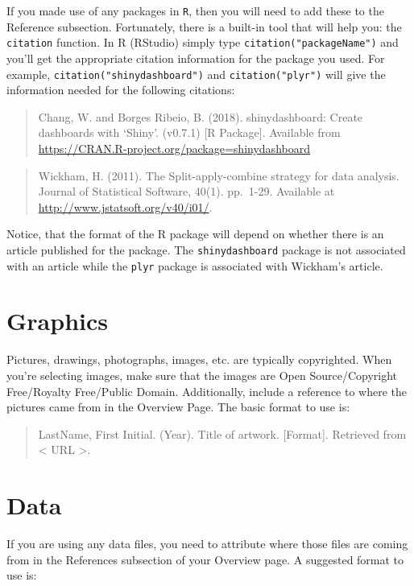 \documentclass[]{book}
\begin{document}
If you made use of any packages in \texttt{R}, then you will need to add these to the Reference subsection. Fortunately, there is a built-in tool that will help you: the \texttt{citation} function. In R (RStudio) simply type \texttt{citation("packageName")} and you'll get the appropriate citation information for the package you used. For example, \texttt{citation("shinydashboard")} and \texttt{citation("plyr")} will give the information needed for the following citations:

\begin{quote}
Chang, W. and Borges Ribeio, B. (2018). shinydashboard: Create dashboards with `Shiny'. (v0.7.1) {[}R Package{]}. Available from \url{https://CRAN.R-project.org/package=shinydashboard}
\end{quote}

\begin{quote}
Wickham, H. (2011). The Split-apply-combine strategy for data analysis. Journal of Statistical Software, 40(1). pp.~1-29. Available at \url{http://www.jstatsoft.org/v40/i01/}.
\end{quote}

Notice, that the format of the R package will depend on whether there is an article published for the package. The \texttt{shinydashboard} package is not associated with an article while the \texttt{plyr} package is associated with Wickham's article.

\hypertarget{graphics-1}{%
\section{Graphics}\label{graphics-1}}

Pictures, drawings, photographs, images, etc. are typically copyrighted. When you're selecting images, make sure that the images are Open Source/Copyright Free/Royalty Free/Public Domain. Additionally, include a reference to where the pictures came from in the Overview Page. The basic format to use is:

\begin{quote}
LastName, First Initial. (Year). Title of artwork. {[}Format{]}. Retrieved from \textless{} URL \textgreater{}.
\end{quote}

\hypertarget{data}{%
\section{Data}\label{data}}

If you are using any data files, you need to attribute where those files are coming from in the References subsection of your Overview page. A suggested format to use is:
\end{document}
